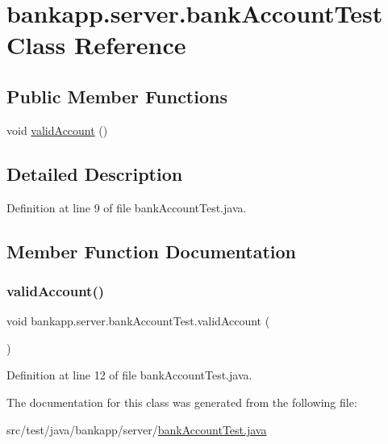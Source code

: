 \hypertarget{classbankapp_1_1server_1_1bank_account_test}{}\section{bankapp.\+server.\+bank\+Account\+Test Class Reference}
\label{classbankapp_1_1server_1_1bank_account_test}
\subsection*{Public Member Functions}
\begin{DoxyCompactItemize}
\item 
void \hyperlink{classbankapp_1_1server_1_1bank_account_test_a3e13bd3f844ad027baa98092f5ed2b2a}{valid\+Account} ()
\end{DoxyCompactItemize}


\subsection{Detailed Description}


Definition at line 9 of file bank\+Account\+Test.\+java.



\subsection{Member Function Documentation}
\mbox{\label{classbankapp_1_1server_1_1bank_account_test_a3e13bd3f844ad027baa98092f5ed2b2a}} 
\subsubsection{\texorpdfstring{valid\+Account()}{validAccount()}}
{\footnotesize\ttfamily void bankapp.\+server.\+bank\+Account\+Test.\+valid\+Account (\begin{DoxyParamCaption}{ }\end{DoxyParamCaption})}



Definition at line 12 of file bank\+Account\+Test.\+java.



The documentation for this class was generated from the following file\+:\begin{DoxyCompactItemize}
\item 
src/test/java/bankapp/server/\hyperlink{bank_account_test_8java}{bank\+Account\+Test.\+java}\end{DoxyCompactItemize}
